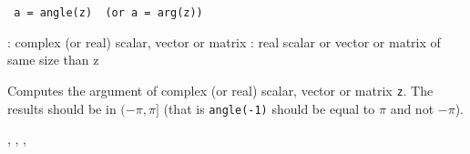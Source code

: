 
\begin{mandesc}
\end{mandesc}

\begin{calling_sequence}
\begin{verbatim}
 a = angle(z)  (or a = arg(z))
\end{verbatim}
\end{calling_sequence}

\begin{parameters}
  \begin{varlist}
   : complex (or real) scalar, vector or matrix
   : real scalar or vector or matrix of same size than z
  \end{varlist}
\end{parameters}

\begin{mandescription}
Computes the argument of complex (or real) scalar, vector or matrix \verb+z+.
The results should be in $(-\pi,\pi]$ (that is \verb+angle(-1)+ should be equal
to $\pi$ and not $-\pi$).
\end{mandescription}

\begin{examples}
\begin{program}
\end{program}
\end{examples}

\begin{manseealso}
, , , 
\end{manseealso}

